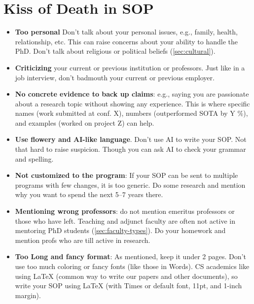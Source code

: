 \documentclass[oneside,11pt,dvipsnames]{book}
\begin{document}
\section{Kiss of Death in SOP} \label{sec:kiss-of-death-sop}

\begin{itemize}
\item \textbf{Too personal} Don't talk about your personal issues, e.g., family, health, relationship, etc. This can raise concerns about your ability to handle the PhD. Don't talk about religious or political beliefs (\autoref{sec:cultural}).
\item \textbf{Criticizing} your current or previous institution or professors. Just like in a job interview, don't badmouth your current or previous employer. 
\item \textbf{No concrete evidence to back up claims}: e.g., saying you are passionate about a research topic without showing any experience. This is where specific names (work submitted at conf. X), numbers (outperformed SOTA by Y \%), and examples (worked on project Z) can help. 
\item \textbf{Use flowery and AI-like language}. Don't use AI to write your SOP. Not that hard to raise suspicion. Though you can ask AI to check your grammar and spelling.
\item \textbf{Not customized to the program}: If your SOP can be sent to multiple programs with few changes, it is too generic. Do some research and mention why you want to spend the next 5--7 years there.
\item \textbf{Mentioning wrong professors}: do not mention emeritus professors or those who have left.  Teaching and adjunct faculty are often not active in mentoring PhD students (\autoref{sec:faculty-types}). Do your homework and mention profs who are till active in research. 
\item \textbf{Too Long and fancy format}: As mentioned, keep it under 2 pages. Don't use too much coloring or fancy fonts (like those in Words). CS academics like using LaTeX (common way to write our papers and other documents), so write your SOP using LaTeX (with Times or default font, 11pt, and 1-inch margin).
\end{itemize}
\end{document}
